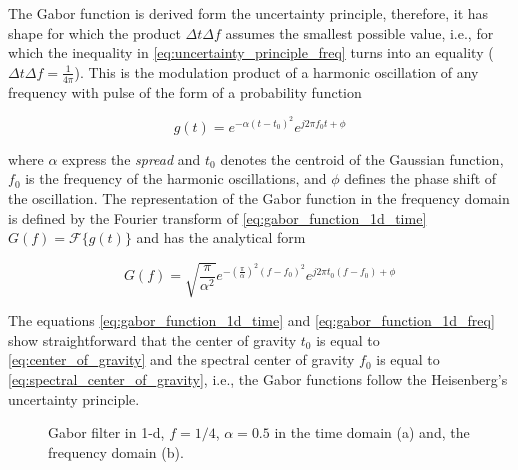 The Gabor function is derived form the uncertainty principle, therefore, it has shape for which the product $\Delta t \Delta f$ assumes the smallest possible value, i.e., for which the inequality in \eqref{eq:uncertainty_principle_freq} turns into an equality ($\Delta t \Delta f = \frac{1}{4 \pi}$). This is the modulation product of a harmonic oscillation of any frequency with pulse of the form of a probability function \cite{Gabor:JIEE:1946a}

\begin{equation}\label{eq:gabor_function_1d_time}
    g(t) =  e ^{-\alpha(t-t_0)^2} e ^{j 2 \pi f_0 t + \phi}
\end{equation}

where $\alpha$ express the \textit{spread} and $t_0$ denotes the centroid of the Gaussian function, $f_0$ is the frequency of the harmonic oscillations, and $\phi$ defines the phase shift of the oscillation. The representation of the Gabor function in the frequency domain is defined by the Fourier transform of \eqref{eq:gabor_function_1d_time} $G(f) = \mathcal{F}\{g(t)\}$ and has the analytical form


\begin{equation}\label{eq:gabor_function_1d_freq}
    G(f) =  \sqrt{\frac{\pi}{\alpha^2}} e ^{-\left(\frac{\pi}{\alpha}\right) ^{2} (f-f_0)^2} e ^{j 2 \pi t_0 (f-f_0) + \phi}
\end{equation}

The equations \eqref{eq:gabor_function_1d_time} and \eqref{eq:gabor_function_1d_freq} show straightforward that the center of gravity $t_0$ is equal to \eqref{eq:center_of_gravity} and the spectral center of gravity $f_0$ is equal to \eqref{eq:spectral_center_of_gravity}, i.e., the Gabor functions follow the Heisenberg's uncertainty principle.  

\begin{figure}
	\centering
\caption{Gabor filter in 1-d, $f =1/4$, $\alpha=0.5$ in the time domain (a) and, the frequency domain (b).}\label{fig:Gabor_filter_time_freq}
\end{figure}


